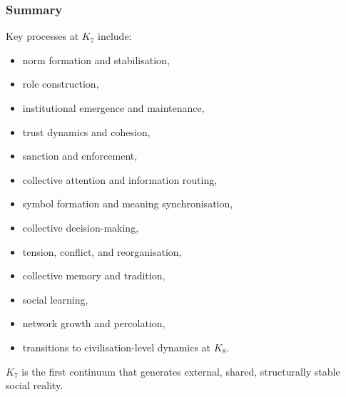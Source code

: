 \subsubsection{Summary}

Key processes at $K_7$ include:
\begin{itemize}
    \item norm formation and stabilisation,
    \item role construction,
    \item institutional emergence and maintenance,
    \item trust dynamics and cohesion,
    \item sanction and enforcement,
    \item collective attention and information routing,
    \item symbol formation and meaning synchronisation,
    \item collective decision-making,
    \item tension, conflict, and reorganisation,
    \item collective memory and tradition,
    \item social learning,
    \item network growth and percolation,
    \item transitions to civilisation-level dynamics at $K_8$.
\end{itemize}

$K_7$ is the first continuum that generates external, shared, 
structurally stable social reality.
